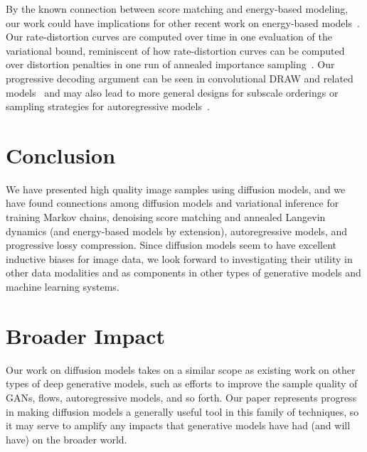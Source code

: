 \documentclass{article}
\begin{document}
By the known connection between score matching and energy-based modeling, our work could have implications for other recent work on energy-based models~\citep{xie2016theory,xie2017synthesizing,xie2018learning,gao2018learning,xie2019learning,gao2020flow,du2019implicit,nijkamp2019anatomy,grathwohl2020your,deng2020residual}. Our rate-distortion curves are computed over time in one evaluation of the variational bound, reminiscent of how rate-distortion curves can be computed over distortion penalties in one run of annealed importance sampling~\citep{huang2020evaluating}. Our progressive decoding argument can be seen in convolutional DRAW and related models~\citep{gregor2016towards,nichol2020vq} and may also lead to more general designs for subscale orderings or sampling strategies for autoregressive models~\citep{menick2018generating,wiggers2020predictive}.

\section{Conclusion}

We have presented high quality image samples using diffusion models, and we have found connections among diffusion models and variational inference for training Markov chains, denoising score matching and annealed Langevin dynamics (and energy-based models by extension), autoregressive models, and progressive lossy compression. Since diffusion models seem to have excellent inductive biases for image data, we look forward to investigating their utility in other data modalities and as components in other types of generative models and machine learning systems.


\section*{Broader Impact}

Our work on diffusion models takes on a similar scope as existing work on other types of deep generative models, such as efforts to improve the sample quality of GANs, flows, autoregressive models, and so forth. Our paper represents progress in making diffusion models a generally useful tool in this family of techniques, so it may serve to amplify any impacts that generative models have had (and will have) on the broader world.
\end{document}
